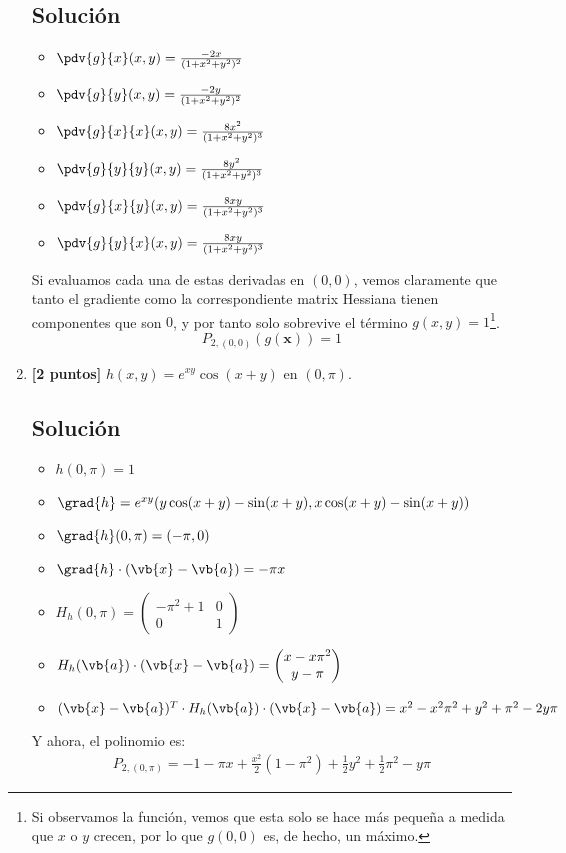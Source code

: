 \documentclass[12pt,a4paper,reqno]{article}
\begin{document}
\begin{enumerate}[label={(\alph*)}]
		\subsection*{Solución}
		\begin{itemize}
			\item $\pdv{g}{x}(x,y) = \frac{-2x}{(1+x ^{2}+y ^{2}) ^{2}}$
			\item $\pdv{g}{y}(x,y)= \frac{-2y}{(1+x ^{2}+y ^{2})^{2}}$
			\item $\pdv{g}{x}{x}(x,y)= \frac{8x ^{2}}{(1+x ^{2}+y ^{2})^{3}}$
			\item $\pdv{g}{y}{y}(x,y)= \frac{8y ^{2}}{(1+x ^{2}+y ^{2})^{3}}$
			\item $\pdv{g}{x}{y}(x,y)= \frac{8xy}{(1+x ^{2}+y ^{2})^{3}}$
			\item $\pdv{g}{y}{x}(x,y)= \frac{8xy}{(1+x ^{2}+y ^{2})^{3}}$ 
		\end{itemize}
		Si evaluamos cada una de estas derivadas en $(0,0)$, vemos claramente que tanto el gradiente como la correspondiente matrix Hessiana tienen componentes que son $0$, y por tanto solo sobrevive el término $g(x,y)=1$\footnote{Si observamos la función, vemos que esta solo se hace más pequeña a medida que $x$ o $y$ crecen, por lo que $g(0,0)$ es, de hecho, un máximo.}.   
		\[
			P_{2,(0,0)}(g(\mathbf{x}))=1
		\]
		\item \textbf{[2 puntos]} $h(x,y)=e^{xy}\cos(x+y)$ en $(0,\pi)$.
		
		\subsection*{Solución}
		\begin{itemize}
			\item $h(0, \pi)=1$
			\item $\grad{h}=e^{xy}(y\cos(x+y)-\sin(x+y),x\cos(x+y)-\sin(x+y))$
			\item $\grad{h}(0,\pi)=(-\pi,0)$
			\item $\grad{h}\cdot (\vb{x}-\vb{a})=-\pi x$
			\item $H_{h}(0,\pi)= \begin{pmatrix}
					-\pi ^{2}+1 & 0 \\ 0 & 1
			\end{pmatrix}
			$
		\item $H_{h}(\vb{a})\cdot (\vb{x}-\vb{a})= \begin{pmatrix} 
				x-x\pi ^{2}\\y-\pi
			\end{pmatrix} $ 
		\item $(\vb{x}-\vb{a})^{T}\cdot H_{h}(\vb{a})\cdot (\vb{x}-\vb{a})=
				x ^{2}-x ^{2}\pi ^{2}+y ^{2}+ \pi ^{2} -2y\pi
			$ 
		\end{itemize}		
	Y ahora, el polinomio es:
	\begin{equation}
		\begin{split}
			P_{2,(0,\pi)} = -1-\pi x + \frac{x ^{2}}{2}(1-\pi ^{2}) +\frac{1}{2} y ^{2} +\frac{1}{2} \pi ^{2} -y \pi
		\end{split}
	\end{equation}
	\end{enumerate}
	
\end{document}
